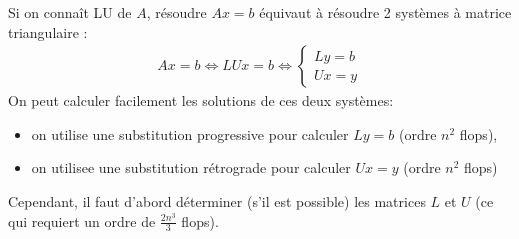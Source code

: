Si on connaît LU de $A$, résoudre $Ax = b$ équivaut à résoudre 2 systèmes à matrice triangulaire : 
\begin{eqnarray}
	Ax=b 
	\Leftrightarrow 
	LUx=b 
	\Leftrightarrow
	\begin{cases}
		Ly=b
		\\
		Ux=y
	\end{cases}
\end{eqnarray}
On peut calculer facilement les solutions de ces deux systèmes:
\begin{itemize}
	\item on utilise une substitution progressive pour calculer $Ly = b$ (ordre $n^2$ flops),
	\item on utilisee une substitution rétrograde pour calculer $Ux = y$ (ordre $n^2$ flops)
\end{itemize}
Cependant, il faut d’abord déterminer (s’il est possible) les matrices $L$ et $U$ (ce 
qui requiert un ordre de $\frac{2n^3}{3}$ flops). 

